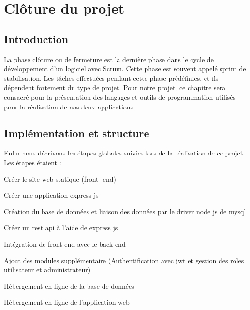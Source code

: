 \chapter{ Cl\^{o}ture du projet }

\section{Introduction}

La phase cl\^{o}ture ou de fermeture est la derni\`{e}re phase dans le cycle de d\'{e}veloppement d'un
logiciel avec Scrum. Cette phase est souvent appel\'{e} sprint de stabilisation. Les t\^{a}ches
effectu\'{e}es pendant cette phase pr\'{e}d\'{e}finies, et ils d\'{e}pendent fortement du type de projet.
Pour notre projet, ce chapitre sera consacr\'{e} pour la pr\'{e}sentation des langages et outils de
programmation utilis\'{e}s pour la r\'{e}alisation de nos deux applications.



\section{Impl\'{e}mentation et structure}
Enfin nous d\'{e}crivons les \'{e}tapes globales suivies lors de la r\'{e}alisation de ce projet.
Les \'{e}tapes \'{e}taient :
\bigskip


\textbullet{}  Cr\'{e}er le site web statique (front -end)  \newline

\textbullet{} Cr\'{e}er une application express js  \newline

\textbullet{}  Cr\'{e}ation du base de donn\'{e}es et liaison des donn\'{e}es par le driver node js  de mysql \newline

\textbullet{}Cr\'{e}er un rest api \`{a} l'aide de express js  \newline

\textbullet{}Int\'{e}gration de front-end avec le back-end  \newline

\textbullet{}Ajout des modules suppl\'{e}mentaire (Authentification avec jwt et gestion des roles utilisateur et administrateur)  \newline

\textbullet{}  H\'{e}bergement en ligne de la base de donn\'{e}es \newline

\textbullet{} H\'{e}bergement en ligne de l'application web  \newline




